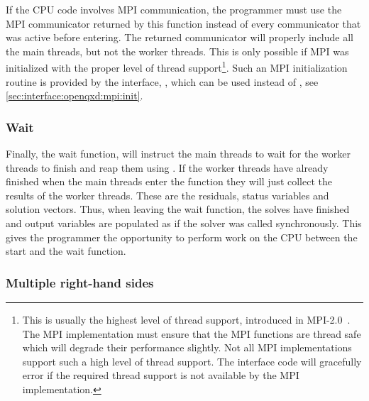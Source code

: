 If the CPU code involves MPI communication, the programmer must use the MPI communicator returned by this function instead of every communicator that was active before entering.
The returned communicator will properly include all the main threads, but not the worker threads.
This is only possible if MPI was initialized with the proper level of thread support\footnote{This is usually the highest level of thread support,  introduced in MPI-2.0~\cite{standard:mpi-2.0}. The MPI implementation must ensure that the MPI functions are thread safe which will degrade their performance slightly. Not all MPI implementations support such a high level of thread support. The interface code will gracefully error if the required thread support is not available by the MPI implementation.}.
Such an MPI initialization routine is provided by the interface, , which can be used instead of , see \cref{sec:interface:openqxd:mpi:init}.

\subsubsection{Wait}
\label{sec:interface:solver:async:wait}

Finally, the wait function,  will instruct the main threads to wait for the worker threads to finish and reap them using .
If the worker threads have already finished when the main threads enter the function they will just collect the results of the worker threads.
These are the residuals, status variables and solution vectors.
Thus, when leaving the wait function, the solves have finished and output variables are populated as if the solver was called synchronously.
This gives the programmer the opportunity to perform work on the CPU between the start and the wait function.

\subsubsection{Multiple right-hand sides}

